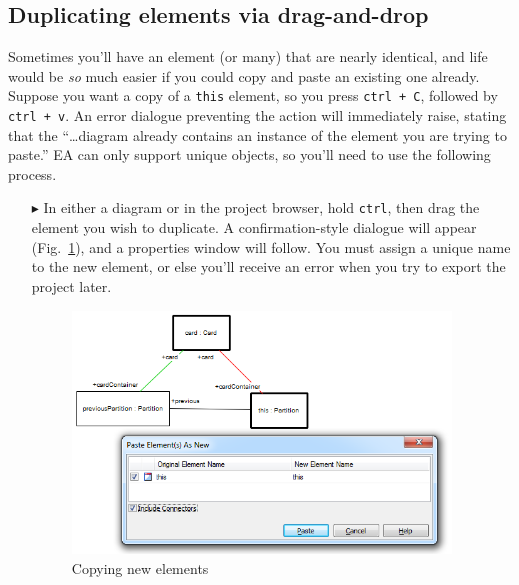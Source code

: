 \newpage

\subsection{Duplicating elements via drag-and-drop}

Sometimes you'll have an element (or many) that are nearly identical, and life would be \emph{so} much easier if you could copy and paste an existing one
already. Suppose you want a copy of a \texttt{this} element, so you press \texttt{ctrl + C}, followed by \texttt{ctrl + v}. An error dialogue preventing the
action will immediately raise, stating that the ``\ldots diagram already contains an instance of the element you are trying to paste.'' EA can only support
unique objects, so you'll need to use the following process.

\begin{itemize}

\item[$\blacktriangleright$] In either a diagram or in the project browser, hold \texttt{ctrl}, then drag the element you wish to duplicate. A
confirmation-style dialogue will appear (Fig.~\ref{ea:dupWindow}), and a properties window will follow. You must assign a unique name to the new element, or
else you'll receive an error when you try to export the project later.

\vspace{0.5cm}

\begin{figure}[htbp]
\begin{center}
  \includegraphics[width=0.95\textwidth]{ea_duplicatingElements}
  \caption{Copying new elements}  
  \label{ea:dupWindow}
\end{center}
\end{figure}

\end{itemize}
